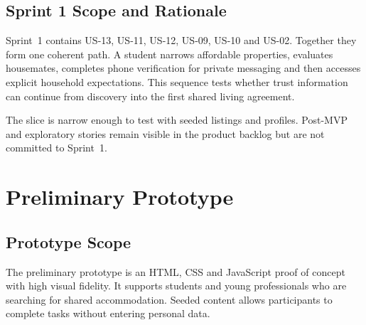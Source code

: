 \documentclass[11pt,a4paper]{article}
\begin{document}
\subsection{Sprint 1 Scope and Rationale}

Sprint~1 contains US-13, US-11, US-12, US-09, US-10 and US-02. Together they form one coherent path. A student narrows affordable properties, evaluates housemates, completes phone verification for private messaging and then accesses explicit household expectations. This sequence tests whether trust information can continue from discovery into the first shared living agreement.

The slice is narrow enough to test with seeded listings and profiles. Post-MVP and exploratory stories remain visible in the product backlog but are not committed to Sprint~1.

\section{Preliminary Prototype}

\subsection{Prototype Scope}

The preliminary prototype is an HTML, CSS and JavaScript proof of concept with high visual fidelity. It supports students and young professionals who are searching for shared accommodation. Seeded content allows participants to complete tasks without entering personal data.
\end{document}
